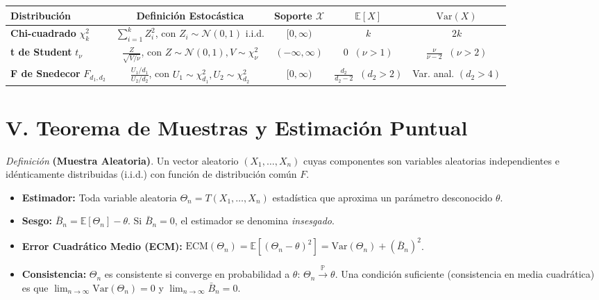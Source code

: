\begin{center}
\renewcommand{\arraystretch}{1.8}
\begin{tabular}{lcccc}
    \toprule
    \textbf{Distribución} & \textbf{Definición Estocástica} & \textbf{Soporte} $\mathcal{X}$ & $\mathbb{E}[X]$ & $\text{Var}(X)$ \\
    \midrule
    \textbf{Chi-cuadrado} $\chi^2_k$ & $\sum_{i=1}^k Z_i^2$, con $Z_i \sim \mathcal{N}(0,1)$ i.i.d. & $[0, \infty)$ & $k$ & $2k$ \\
    \textbf{t de Student} $t_\nu$ & $\frac{Z}{\sqrt{V/\nu}}$, con $Z \sim \mathcal{N}(0,1), V \sim \chi^2_\nu$ & $(-\infty, \infty)$ & $0 \;\; (\nu > 1)$ & $\frac{\nu}{\nu-2} \;\; (\nu > 2)$ \\
    \textbf{F de Snedecor} $F_{d_1, d_2}$ & $\frac{U_1/d_1}{U_2/d_2}$, con $U_1 \sim \chi^2_{d_1}, U_2 \sim \chi^2_{d_2}$ & $[0, \infty)$ & $\frac{d_2}{d_2-2} \;\; (d_2 > 2)$ & Var. anal. $(d_2 > 4)$ \\
    \bottomrule
\end{tabular}
\end{center}

\vspace{1.5em}

\section*{V. Teorema de Muestras y Estimación Puntual}
\vspace{1em}

\noindent \textit{Definición} \textbf{(Muestra Aleatoria)}. Un vector aleatorio $(X_1, \dots, X_n)$ cuyas componentes son variables aleatorias independientes e idénticamente distribuidas (i.i.d.) con función de distribución común $F$.

\begin{itemize}
    \item \textbf{Estimador:} Toda variable aleatoria $\Theta_n = T(X_1, \dots, X_n)$ estadística que aproxima un parámetro desconocido $\theta$.
    \item \textbf{Sesgo:} $\bar{B}_n = \mathbb{E}[\Theta_n] - \theta$. Si $\bar{B}_n = 0$, el estimador se denomina \textit{insesgado}.
    \item \textbf{Error Cuadrático Medio (ECM):} $\text{ECM}(\Theta_n) = \mathbb{E}[(\Theta_n - \theta)^2] = \text{Var}(\Theta_n) + (\bar{B}_n)^2$.
    \item \textbf{Consistencia:} $\Theta_n$ es consistente si converge en probabilidad a $\theta$: $\Theta_n \xrightarrow{\mathbb{P}} \theta$. Una condición suficiente (consistencia en media cuadrática) es que $\lim_{n\to\infty} \text{Var}(\Theta_n) = 0$ y $\lim_{n\to\infty} \bar{B}_n = 0$.
\end{itemize}

